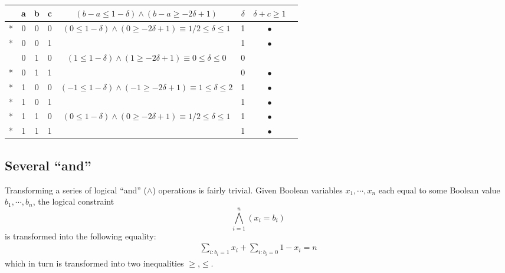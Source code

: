 \begin{table}[H]
\centering
	\begin{tabular}{cccccccc}
	  & a & b & c & $(b - a \le 1 - \delta) \wedge (b - a \ge -2\delta + 1)$                     & $\delta$ & $\delta + c \ge 1$ \\
	\midrule
	* & 0 & 0 & 0 & $(0 \le 1 - \delta) \wedge (0 \ge -2\delta + 1) \equiv 1/2 \le \delta \le 1$ &        1 & $\bullet$ \\
	* & 0 & 0 & 1 &                                                                              &        1 & $\bullet$ \\
	  & 0 & 1 & 0 & $(1 \le 1 - \delta) \wedge (1 \ge -2\delta + 1) \equiv   0 \le \delta \le 0$ &        0 &           \\
	* & 0 & 1 & 1 &                                                                              &        0 & $\bullet$ \\
	* & 1 & 0 & 0 & $(-1 \le 1 - \delta) \wedge (-1 \ge -2\delta + 1) \equiv 1 \le \delta \le 2$ &        1 & $\bullet$ \\
	* & 1 & 0 & 1 &                                                                              &        1 & $\bullet$ \\
	* & 1 & 1 & 0 & $(0 \le 1 - \delta) \wedge (0 \ge -2\delta + 1) \equiv 1/2 \le \delta \le 1$ &        1 & $\bullet$ \\
	* & 1 & 1 & 1 &                                                                              &        1 & $\bullet$ \\
	\end{tabular}
\label{table:B:3-linear-expressions}
\end{table}

\subsection{Several ``and''}
\label{sec:conv-non-linear:several-ands}

Transforming a series of logical ``and'' ($\wedge$) operations is fairly trivial.
Given Boolean variables $x_1,\cdots,x_n$ each equal to some Boolean value $b_1,\cdots,b_n$,
the logical constraint
\begin{equation}
\label{eq:B:several-ands}
\bigwedge_{i=1}^{n} (x_i = b_i)
\end{equation}
is transformed into the following equality:
\begin{eqnarray}
\label{eq:B:several-ands:linear}
\sum_{i : b_i=1} x_i + \sum_{i : b_i=0} 1 - x_i = n
\end{eqnarray}
which in turn is transformed into two inequalities $\ge$,$\le$.

